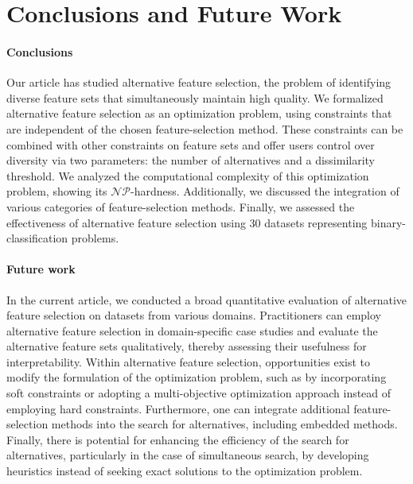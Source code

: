 \documentclass[iicol, sn-basic, Numbered]{sn-jnl} %
\theoremstyle{plain}
\theoremstyle{definition}
\begin{document}
\section{Conclusions and Future Work}
\label{sec:afs:conclusion}

\paragraph{Conclusions}

Our article has studied alternative feature selection, the problem of identifying diverse feature sets that simultaneously maintain high quality. 
We formalized alternative feature selection as an optimization problem, using constraints that are independent of the chosen feature-selection method. 
These constraints can be combined with other constraints on feature sets and offer users control over diversity via two parameters: the number of alternatives and a dissimilarity threshold.
We analyzed the computational complexity of this optimization problem, showing its $\mathcal{NP}$-hardness. 
Additionally, we discussed the integration of various categories of feature-selection methods. 
Finally, we assessed the effectiveness of alternative feature selection using 30 datasets representing binary-classification problems.

\paragraph{Future work}

In the current article, we conducted a broad quantitative evaluation of alternative feature selection on datasets from various domains.
Practitioners can employ alternative feature selection in domain-specific case studies and evaluate the alternative feature sets qualitatively, thereby assessing their usefulness for interpretability.
Within alternative feature selection, opportunities exist to modify the formulation of the optimization problem, such as by incorporating soft constraints or adopting a multi-objective optimization approach instead of employing hard constraints. 
Furthermore, one can integrate additional feature-selection methods into the search for alternatives, including embedded methods. 
Finally, there is potential for enhancing the efficiency of the search for alternatives, particularly in the case of simultaneous search, by developing heuristics instead of seeking exact solutions to the optimization problem.

\backmatter
\end{document}

